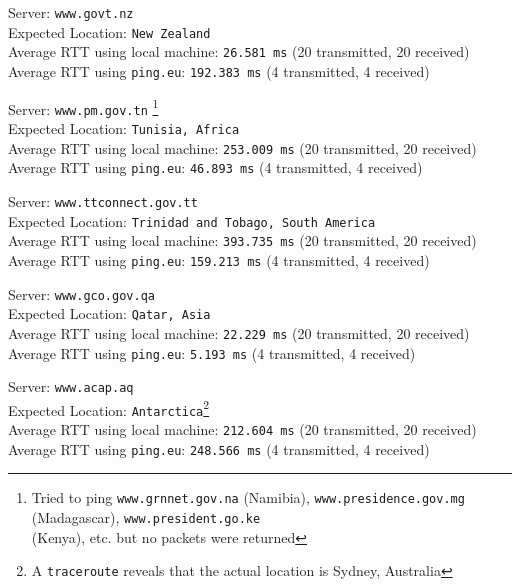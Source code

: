 \documentclass[11pt, fleqn]{article}
\begin{document}
\hrulefill
\smallskip

Server: \texttt{www.govt.nz} \\
Expected Location: \texttt{New Zealand}\\
Average RTT using local machine: \texttt{26.581 ms} (20 transmitted, 20 received)\\
Average RTT using \texttt{ping.eu}: \texttt{192.383 ms} (4 transmitted, 4 received)


\hrulefill
\smallskip

Server: \texttt{www.pm.gov.tn} \footnote{Tried to ping 
\texttt{www.grnnet.gov.na} (Namibia), \texttt{www.presidence.gov.mg} (Madagascar), \texttt{www.president.go.ke} \\ (Kenya), etc. but no packets were returned}\\
Expected Location: \texttt{Tunisia, Africa}\\
Average RTT using local machine: \texttt{253.009 ms} (20 transmitted, 20 received)\\
Average RTT using \texttt{ping.eu}: \texttt{46.893 ms} (4 transmitted, 4 received)

\hrulefill
\smallskip

Server: \texttt{www.ttconnect.gov.tt} \\
Expected Location: \texttt{Trinidad and Tobago, South America}\\
Average RTT using local machine: \texttt{393.735 ms} (20 transmitted, 20 received)\\
Average RTT using \texttt{ping.eu}: \texttt{159.213 ms} (4 transmitted, 4 received)

\hrulefill
\smallskip

Server: \texttt{www.gco.gov.qa} \\
Expected Location: \texttt{Qatar, Asia}\\
Average RTT using local machine: \texttt{22.229 ms} (20 transmitted, 20 received)\\
Average RTT using \texttt{ping.eu}: \texttt{5.193 ms} (4 transmitted, 4 received)

\hrulefill
\smallskip

Server: \texttt{www.acap.aq} \\
Expected Location: \texttt{Antarctica}\footnote{A \texttt{traceroute} reveals that the actual location is Sydney, 
Australia}\\
Average RTT using local machine: \texttt{212.604 ms} (20 transmitted, 20 received)\\
Average RTT using \texttt{ping.eu}: \texttt{248.566 ms} (4 transmitted, 4 received)
\end{document}

